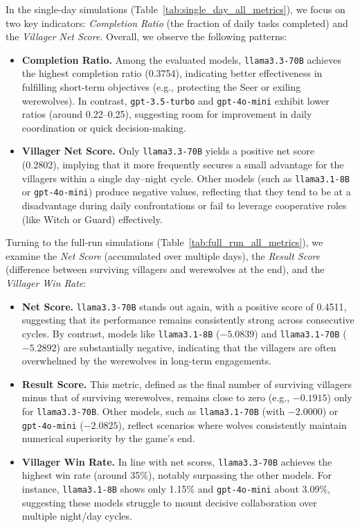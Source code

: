 In the single-day simulations (Table~\ref{tab:single_day_all_metrics}), we focus on two key indicators:
\emph{Completion Ratio} (the fraction of daily tasks completed) and the \emph{Villager Net Score}.
Overall, we observe the following patterns:

\begin{itemize}
    \item \textbf{Completion Ratio.} 
    Among the evaluated models, \texttt{llama3.3-70B} achieves the highest completion ratio (0.3754), 
    indicating better effectiveness in fulfilling short-term objectives (e.g., 
    protecting the Seer or exiling werewolves). 
    In contrast, \texttt{gpt-3.5-turbo} and \texttt{gpt-4o-mini} exhibit lower ratios 
    (around 0.22--0.25), suggesting room for improvement in daily coordination or quick decision-making.

    \item \textbf{Villager Net Score.}
    Only \texttt{llama3.3-70B} yields a positive net score (0.2802), implying 
    that it more frequently secures a small advantage for the villagers within a single day--night cycle.
    Other models (such as \texttt{llama3.1-8B} or \texttt{gpt-4o-mini}) produce negative values,
    reflecting that they tend to be at a disadvantage during daily confrontations 
    or fail to leverage cooperative roles (like Witch or Guard) effectively.
\end{itemize}

Turning to the full-run simulations (Table~\ref{tab:full_run_all_metrics}), we examine 
the \emph{Net Score} (accumulated over multiple days), the \emph{Result Score} 
(difference between surviving villagers and werewolves at the end), and the \emph{Villager Win Rate}:

\begin{itemize}
    \item \textbf{Net Score.}
    \texttt{llama3.3-70B} stands out again, with a positive score of 0.4511, 
    suggesting that its performance remains consistently strong across consecutive cycles.
    By contrast, models like \texttt{llama3.1-8B} ($-5.0839$) 
    and \texttt{llama3.1-70B} ($-5.2892$) are substantially negative, 
    indicating that the villagers are often overwhelmed by the werewolves 
    in long-term engagements.

    \item \textbf{Result Score.}
    This metric, defined as the final number of surviving villagers minus that of surviving werewolves, 
    remains close to zero (e.g., $-0.1915$) only for \texttt{llama3.3-70B}.
    Other models, such as \texttt{llama3.1-70B} (with $-2.0000$) or \texttt{gpt-4o-mini} ($-2.0825$), 
    reflect scenarios where wolves consistently maintain numerical superiority by the game’s end.

    \item \textbf{Villager Win Rate.}
    In line with net scores, \texttt{llama3.3-70B} achieves the highest win rate (around 35\%), 
    notably surpassing the other models. 
    For instance, \texttt{llama3.1-8B} shows only 1.15\% and \texttt{gpt-4o-mini} about 3.09\%, 
    suggesting these models struggle to mount decisive collaboration over multiple night/day cycles.
\end{itemize}

